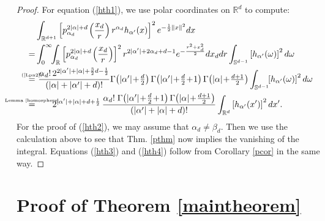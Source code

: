 \documentclass{amsart}
\newcommand{\p}[2]{p_{#1}^{#2}\;\!\!}
\newcommand{\myeq}[1]{\mathrel{\overset{\makebox[0pt]{\text{\tiny #1}}}{=}}}
\newcommand{\R}{\mathbb{R}}
\renewcommand{\S}{\mathbb{S}}
\theoremstyle{plain}
\theoremstyle{definition}
\theoremstyle{remark}
\begin{document}
\begin{proof}
For equation (\ref{hth1}), we use polar coordinates on $\R ^d$ to compute:
\begin{align*}
 &\int_{\R^{d+1}}\left[\p{\alpha_d}{2|\alpha|+d}\left(\frac{x_d}{r}\right) r^{\alpha_d}h_{\alpha'}(x)\right]^2 e^{-\frac{1}{2}\|x\|^2} dx \\
 = & \int_0^\infty\!\!\int_{\R} \left[\p{\alpha_d}{2|\alpha|+d}\left(\frac{x_d}{r}\right)\right]^2 r^{2|\alpha'|+2\alpha_d+d-1} e^{-\frac{r^2+x_d^2}{2} }dx_ddr\int_{\S^{d-1}}\left[h_{\alpha'}(\omega)\right]^2 d\omega \\
\myeq{(\ref{Lpn2})}& \  \frac{\alpha_d!\, 2^{2|\alpha '|+|\alpha|+\frac{3}{2}d-\frac{1}{2}} }{\left(|\alpha|+|\alpha'|+d\right)!} { \textstyle
\Gamma\!\left( |\alpha'| \!+\!\frac{d}{2}\right)\Gamma\!\left( |\alpha'|\!+\! \frac{d}{2}\!+\! 1\right) \Gamma\!\left( |\alpha| \!+\! \frac{d+1}{2}\right) }\int_{\S^{d-1}}\!\!\left[h_{\alpha'}(\omega)\right]^2 d\omega \\
\myeq{Lemma \ref{homosphere}}&\quad\quad 2^{|\alpha '|+|\alpha |+d+\frac{1}{2}}\,
\frac{\alpha_d!\;\Gamma\!\left(|\alpha '|\!+\!\frac{d}{2}\!+\!1\right)\Gamma\!\left(|\alpha |\!+\!\tfrac{d+1}{2}\right)}{\left(|\alpha '|+|\alpha |+d\right)!} \int_{\R^d} \left[h_{\alpha'}(x')\right]^2 dx'.
\end{align*}
For the proof of (\ref{hth2}), we may assume that $\alpha_d \neq \beta_d$. Then we use the calculation above to see that Thm. \ref{pthm} now implies the vanishing of the integral. Equations (\ref{hth3}) and (\ref{hth4}) follow from Corollary \ref{pcor} in the same way.
\end{proof}


\section{Proof of Theorem \ref{maintheorem}} \label{proofsection}
\end{document}
